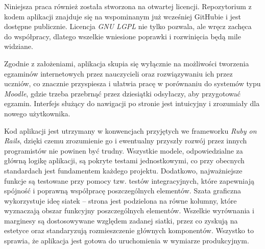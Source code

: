 \documentclass[12pt,twoside]{report}
\begin{document}
Niniejsza praca również została stworzona na otwartej licencji.
Repozytorium z kodem aplikacji znajduje się na wspominanym już wcześniej GitHubie
\cite{github-morgoth} i jest dostępne publicznie. Licencja \emph{GNU LGPL} nie tylko
pozwala, ale wręcz zachęca do współpracy, dlatego wszelkie wniesione poprawki i rozwinięcia
będą mile widziane.


Zgodnie z założeniami, aplikacja skupia się wyłącznie na możliwości tworzenia egzaminów
internetowych przez nauczycieli oraz rozwiązywaniu ich przez uczniów, co znacznie
przyspiesza i ułatwia pracę w porównaniu do systemów typu \emph{Moodle}, gdzie trzeba
przebrnąć przez dziesiątki odsyłaczy, aby przygotować egzamin. Interfejs służący do
nawigacji po stronie jest intuicyjny i zrozumiały dla nowego użytkownika.


Kod aplikacji jest utrzymany w konwencjach przyjętych we frameworku \emph{Ruby on Rails},
dzięki czemu zrozumienie go i ewentualny przyszły rozwój przez innych programistów nie
powinen być trudny. Wszystkie modele, odpowiedzialne za główną logikę aplikacji, są pokryte
testami jednostkowymi, co przy obecnych standardach jest fundamentem każdego projektu.
Dodatkowo, najważniejsze funkcje są testowane przy pomocy tzw. testów integracyjnych, które
zapewniają spójność i poprawną współpracę poszczególnych elementów.
Szata graficzna wykorzystuje ideę siatek -- strona jest podzielona na równe kolumny, które
wyznaczają obszar funkcyjny poszczególnych elementów. Wszelkie wyrównania i marginesy są
dostosowywane względem zadanej siatki, przez co zyskują na estetyce oraz standaryzują
rozmieszczenie głównych komponentów.
Wszystko to sprawia, że aplikacja jest gotowa do uruchomienia w wymiarze produkcyjnym.

\cleardoublepage
\listoflisting

\newpage
\listoffigures
\listoftables

\newpage


\end{document}
